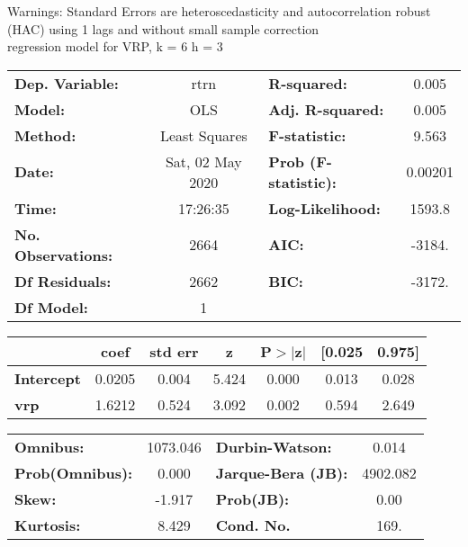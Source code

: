 Warnings: \newline
 [1] Standard Errors are heteroscedasticity and autocorrelation robust (HAC) using 1 lags and without small sample correction\\ 

regression model for VRP, k = 6 h = 3\begin{center}
\begin{tabular}{lclc}
\toprule
\textbf{Dep. Variable:}    &       rtrn       & \textbf{  R-squared:         } &     0.005   \\
\textbf{Model:}            &       OLS        & \textbf{  Adj. R-squared:    } &     0.005   \\
\textbf{Method:}           &  Least Squares   & \textbf{  F-statistic:       } &     9.563   \\
\textbf{Date:}             & Sat, 02 May 2020 & \textbf{  Prob (F-statistic):} &  0.00201    \\
\textbf{Time:}             &     17:26:35     & \textbf{  Log-Likelihood:    } &    1593.8   \\
\textbf{No. Observations:} &        2664      & \textbf{  AIC:               } &    -3184.   \\
\textbf{Df Residuals:}     &        2662      & \textbf{  BIC:               } &    -3172.   \\
\textbf{Df Model:}         &           1      & \textbf{                     } &             \\
\bottomrule
\end{tabular}
\begin{tabular}{lcccccc}
                   & \textbf{coef} & \textbf{std err} & \textbf{z} & \textbf{P$> |$z$|$} & \textbf{[0.025} & \textbf{0.975]}  \\
\midrule
\textbf{Intercept} &       0.0205  &        0.004     &     5.424  &         0.000        &        0.013    &        0.028     \\
\textbf{vrp}       &       1.6212  &        0.524     &     3.092  &         0.002        &        0.594    &        2.649     \\
\bottomrule
\end{tabular}
\begin{tabular}{lclc}
\textbf{Omnibus:}       & 1073.046 & \textbf{  Durbin-Watson:     } &    0.014  \\
\textbf{Prob(Omnibus):} &   0.000  & \textbf{  Jarque-Bera (JB):  } & 4902.082  \\
\textbf{Skew:}          &  -1.917  & \textbf{  Prob(JB):          } &     0.00  \\
\textbf{Kurtosis:}      &   8.429  & \textbf{  Cond. No.          } &     169.  \\
\bottomrule
\end{tabular}
\end{center}

